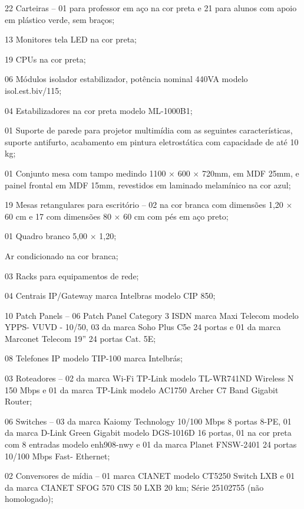 \documentclass[
	12pt,				%
	openright,			%
	twoside,			%
	a4paper,			%
	chapter=TITLE,		%
	english,			%
	french,				%
	spanish,			%
	brazil,				%
	]{abntex2}
\begin{document}
\begin{alineas}
	\item 22 Carteiras -- 01 para professor em aço na cor preta e 21 para alunos com apoio em plástico verde, sem braços;
	\item 13 Monitores tela LED na cor preta;
	\item 19 CPUs na cor preta;
	\item 06 Módulos isolador estabilizador, potência nominal 440VA modelo
isol.est.biv/115;
	\item 04 Estabilizadores na cor preta modelo ML-1000B1;
	\item 01 Suporte de parede para projetor multimídia com as seguintes
características, suporte antifurto, acabamento em pintura eletrostática
com capacidade de até 10 kg;

	\item  01 Conjunto mesa com tampo medindo 1100 $\times$ 600 $\times$ 720mm, em MDF 25mm, e painel frontal em MDF 15mm, revestidos em laminado melamínico na cor azul;
	\item 19  Mesas retangulares para escritório -- 02  na cor branca com dimensões 1,20 $\times$ 60 cm e 17  com dimensões 80 $\times$ 60 cm com pés em aço preto;
	\item 01 Quadro branco 5,00 $\times$ 1,20;
	\item Ar condicionado na cor branca;
	\item 03 Racks para equipamentos de rede;
	\item 04 Centrais IP/Gateway marca Intelbras modelo CIP 850;
	\item 10 Patch Panels -- 06 Patch Panel Category 3 ISDN marca Maxi Telecom modelo YPPS-
VUVD - 10/50, 03 da marca Soho Plus C5e 24 portas e 01 da marca Marconet Telecom 19'' 24 portas Cat. 5E;
	\item 08 Telefones IP modelo TIP-100 marca Intelbrás;
	\item 03 Roteadores -- 02 da marca Wi-Fi TP-Link modelo TL-WR741ND Wireless N 150
Mbps e 01 da  marca TP-Link modelo AC1750 Archer C7 Band Gigabit Router;
	\item 06 Switches -- 03 da marca Kaiomy Technology 10/100 Mbps 8 portas 8-PE, 01 da marca D-Link Green Gigabit modelo DGS-1016D 16 portas, 01 na cor preta com 8 entradas modelo enh908-nwy e 01 da marca Planet FNSW-2401 24 portas 10/100 Mbps Fast-
Ethernet;
	\item 02 Conversores de mídia -- 01 marca CIANET modelo CT5250 Switch LXB e 01 da marca CIANET SFOG 570 CIS 50 LXB 20 km;
Série 25102755 (não homologado);

\end{alineas}
\end{document}
